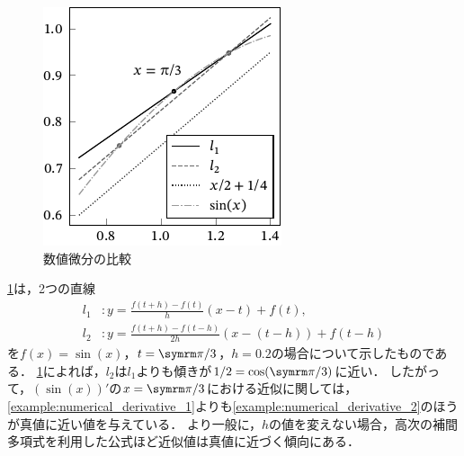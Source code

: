 \documentclass[../../main]{subfiles}
\begin{document}
\begin{figure}[htbp]
  \centering
  \includegraphics{differentiation.pdf}
  \caption{数値微分の比較}
  \label{figure:differentiation}
\end{figure}

\cref{figure:differentiation}は，2つの直線
\begin{align*}
  l_1 &\colon y=\frac{f(t+h)-f(t)}{h}(x-t)+f(t), \\
  l_2 &\colon y=\frac{f(t+h)-f(t-h)}{2h}(x-(t-h))+f(t-h)
\end{align*}
を\(f(x)=\sin(x)\)，\(t=\krez/3\)，\(h=0.2\)の場合について示したものである．
\cref{figure:differentiation}によれば，\(l_2\)は\(l_1\)よりも傾きが\(1/2=\cos(\krez/3)\)に近い．
したがって，\((\sin(x))'\)の\(x=\krez/3\)における近似に関しては，\cref{example:numerical_derivative_1}よりも\cref{example:numerical_derivative_2}のほうが真値に近い値を与えている．
より一般に，\(h\)の値を変えない場合，高次の補間多項式を利用した公式ほど近似値は真値に近づく傾向にある．
\end{document}
